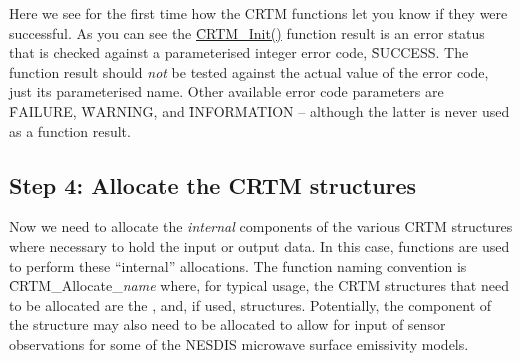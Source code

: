 Here we see for the first time how the CRTM functions let you know if they were successful. As you can see the \hyperref[sec:CRTM_Init_interface]{\f{CRTM\_Init()}} function result is an error status that is checked against a parameterised integer error code, \f{SUCCESS}. The function result should \emph{not} be tested against the actual value of the error code, just its parameterised name. Other available error code parameters are \f{FAILURE}, \f{WARNING}, and \f{INFORMATION} -- although the latter is never used as a function result.


\subsection{Step 4: Allocate the CRTM structures}
Now we need to allocate the \emph{internal} components of the various CRTM structures where necessary to hold the input or output data. In this case, functions are used to perform these ``internal'' allocations. The function naming convention is \f{CRTM\_Allocate\_}\textit{name} where, for typical usage, the CRTM structures that need to be allocated are the \hyperref[sec:atmosphere_structure]{\Atmosphere}, \hyperref[sec:rtsolution_structure]{\RTSolution} and, if used, \hyperref[sec:options_structure]{\Options} structures. Potentially, the \hyperref[sec:sensordata_structure]{\SensorData} component of the \hyperref[sec:surface_structure]{\Surface} structure may also need to be allocated to allow for input of sensor observations for some of the NESDIS microwave surface emissivity models.

